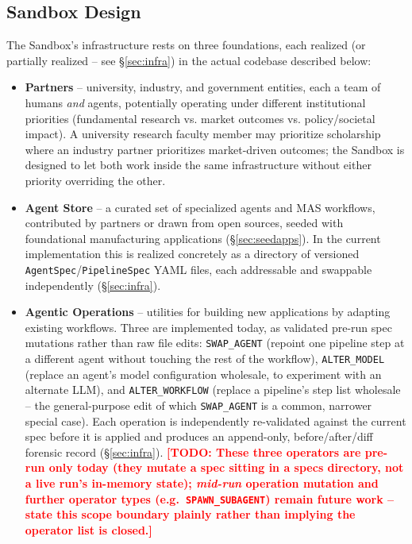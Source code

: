 \documentclass[10pt,conference]{IEEEtran}
\newcommand{\todo}[1]{\textcolor{red}{\textbf{[TODO: #1]}}}
\begin{document}
\subsection{Sandbox Design}
\label{sec:design}
The Sandbox's infrastructure rests on three foundations, each realized (or
partially realized -- see \S\ref{sec:infra}) in the actual codebase described
below:
\begin{itemize}
  \item \textbf{Partners} -- university, industry, and government entities,
  each a team of humans \emph{and} agents, potentially operating under
  different institutional priorities (fundamental research vs. market
  outcomes vs. policy/societal impact). A university research faculty
  member may prioritize scholarship where an industry partner prioritizes
  market-driven outcomes; the Sandbox is designed to let both work inside
  the same infrastructure without either priority overriding the other.
  \item \textbf{Agent Store} -- a curated set of specialized agents and MAS
  workflows, contributed by partners or drawn from open sources, seeded
  with foundational manufacturing applications (\S\ref{sec:seedapps}). In
  the current implementation this is realized concretely as a directory of
  versioned \texttt{AgentSpec}/\texttt{PipelineSpec} YAML files, each
  addressable and swappable independently (\S\ref{sec:infra}).
  \item \textbf{Agentic Operations} -- utilities for building new
  applications by adapting existing workflows. Three are implemented today,
  as validated pre-run spec mutations rather than raw file edits:
  \texttt{SWAP\_AGENT} (repoint one pipeline step at a different agent
  without touching the rest of the workflow), \texttt{ALTER\_MODEL}
  (replace an agent's model configuration wholesale, to experiment with an
  alternate LLM), and \texttt{ALTER\_WORKFLOW} (replace a pipeline's step
  list wholesale -- the general-purpose edit of which
  \texttt{SWAP\_AGENT} is a common, narrower special case). Each operation
  is independently re-validated against the current spec before it is
  applied and produces an append-only, before/after/diff forensic record
  (\S\ref{sec:infra}). \todo{These three operators are pre-run only today
  (they mutate a spec sitting in a specs directory, not a live run's
  in-memory state); \emph{mid-run} operation mutation and further operator
  types (e.g.\ \texttt{SPAWN\_SUBAGENT}) remain future work -- state this
  scope boundary plainly rather than implying the operator list is
  closed.}
\end{itemize}
\end{document}
